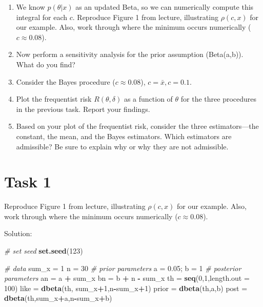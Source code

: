 \documentclass[
]{article}
\newenvironment{Shaded}{\begin{snugshade}}{\end{snugshade}}
\newcommand{\CommentTok}[1]{\textcolor[rgb]{0.56,0.35,0.01}{\textit{#1}}}
\newcommand{\DataTypeTok}[1]{\textcolor[rgb]{0.13,0.29,0.53}{#1}}
\newcommand{\DecValTok}[1]{\textcolor[rgb]{0.00,0.00,0.81}{#1}}
\newcommand{\FloatTok}[1]{\textcolor[rgb]{0.00,0.00,0.81}{#1}}
\newcommand{\KeywordTok}[1]{\textcolor[rgb]{0.13,0.29,0.53}{\textbf{#1}}}
\newcommand{\NormalTok}[1]{#1}
\newcommand{\OperatorTok}[1]{\textcolor[rgb]{0.81,0.36,0.00}{\textbf{#1}}}
\newcommand{\StringTok}[1]{\textcolor[rgb]{0.31,0.60,0.02}{#1}}
\providecommand{\tightlist}{%
  \setlength{\itemsep}{0pt}\setlength{\parskip}{0pt}}
\begin{document}
\begin{enumerate}
\def\labelenumi{\arabic{enumi}.}
\tightlist
\item
  We know \(p(\theta|x)\) as an updated Beta, so we can numerically
  compute this integral for each \(c\). Reproduce Figure 1 from lecture,
  illustrating \(\rho(c,x)\) for our example. Also, work through where
  the minimum occurs numerically (\(c\approx 0.08\)).
\item
  Now perform a sensitivity analysis for the prior assumption
  (Beta(a,b)). What do you find?
\item
  Consider the Bayes procedure (\(c\approx 0.08\)),
  \(c=\bar{x}, c=0.1.\)
\item
  Plot the frequentist risk \(R(\theta, \delta)\) as a function of
  \(\theta\) for the three procedures in the previous task. Report your
  findings.
\item
  Based on your plot of the frequentist risk, consider the three
  estimators---the constant, the mean, and the Bayes estimators. Which
  estimators are admissible? Be sure to explain why or why they are not
  admissible.
\end{enumerate}

\hypertarget{task-1}{%
\section{Task 1}\label{task-1}}

Reproduce Figure 1 from lecture, illustrating \(\rho(c,x)\) for our
example. Also, work through where the minimum occurs numerically
(\(c\approx 0.08\)).

Solution:

\begin{Shaded}
\begin{Highlighting}[]
\CommentTok{# set seed }
\KeywordTok{set.seed}\NormalTok{(}\DecValTok{123}\NormalTok{)}

\CommentTok{# data}
\NormalTok{sum_x =}\StringTok{ }\DecValTok{1}
\NormalTok{n =}\StringTok{ }\DecValTok{30}
\CommentTok{# prior parameters}
\NormalTok{a =}\StringTok{ }\FloatTok{0.05}\NormalTok{; b =}\StringTok{ }\DecValTok{1}
\CommentTok{# posterior parameters}
\NormalTok{an =}\StringTok{ }\NormalTok{a }\OperatorTok{+}\StringTok{ }\NormalTok{sum_x}
\NormalTok{bn =}\StringTok{ }\NormalTok{b }\OperatorTok{+}\StringTok{ }\NormalTok{n }\OperatorTok{-}\StringTok{ }\NormalTok{sum_x}
\NormalTok{th =}\StringTok{ }\KeywordTok{seq}\NormalTok{(}\DecValTok{0}\NormalTok{,}\DecValTok{1}\NormalTok{,}\DataTypeTok{length.out =} \DecValTok{100}\NormalTok{)}
\NormalTok{like =}\StringTok{ }\KeywordTok{dbeta}\NormalTok{(th, sum_x}\OperatorTok{+}\DecValTok{1}\NormalTok{,n}\OperatorTok{-}\NormalTok{sum_x}\OperatorTok{+}\DecValTok{1}\NormalTok{)}
\NormalTok{prior =}\StringTok{ }\KeywordTok{dbeta}\NormalTok{(th,a,b)}
\NormalTok{post =}\StringTok{ }\KeywordTok{dbeta}\NormalTok{(th,sum_x}\OperatorTok{+}\NormalTok{a,n}\OperatorTok{-}\NormalTok{sum_x}\OperatorTok{+}\NormalTok{b)}
\end{Highlighting}
\end{Shaded}
\end{document}
